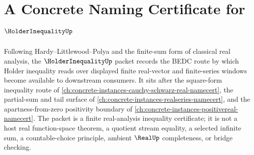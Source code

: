 \chapter{A Concrete Naming Certificate for $\HolderInequalityUp$}
\label{ch:concrete-instances-holder-inequality-namecert}

Following Hardy--Littlewood--Polya and the finite-sum form of classical real analysis, the $\HolderInequalityUp$ packet records the BEDC route by which Holder inequality reads over displayed finite real-vector and finite-series windows become available to downstream consumers. It sits after the square-form inequality route of \autoref{ch:concrete-instances-cauchy-schwarz-real-namecert}, the partial-sum and tail surface of \autoref{ch:concrete-instances-realseries-namecert}, and the apartness-from-zero positivity boundary of \autoref{ch:concrete-instances-positivereal-namecert}. The packet is a finite real-analysis inequality certificate; it is not a host real function-space theorem, a quotient stream equality, a selected infinite sum, a countable-choice principle, ambient $\RealUp$ completeness, or bridge checking.


